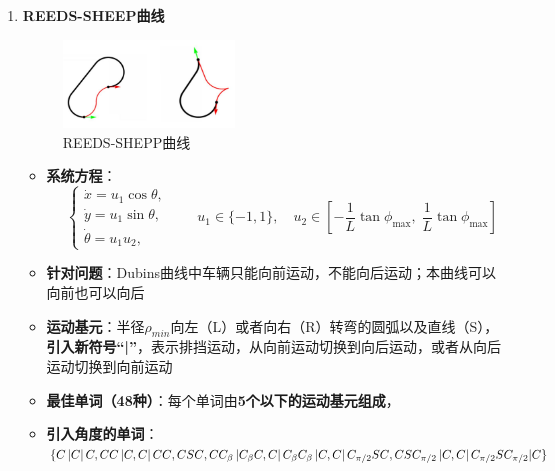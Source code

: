 \documentclass[../main.tex]{subfiles}
\begin{document}
\begin{enumerate}
\begin{itemize}
\begin{enumerate}
                        \item \textbf{REEDS-SHEEP曲线}
                            \begin{figure}[H]
                                \centering
                                \includegraphics[width=0.43\textwidth]{images/reedssheep.png}
                                \caption{REEDS-SHEPP曲线}
                            \end{figure} 
                        \begin{itemize}
                            \item \textbf{系统方程}：\[
                            \quad
                            \begin{cases}
                            \dot{x} = u_1 \cos\theta, \\[4pt]
                            \dot{y} = u_1 \sin\theta, \\[4pt]
                            \dot{\theta} = u_1 u_2,
                            \end{cases}
                            \qquad
                            u_1 \in \{-1, 1\}, \quad
                            u_2 \in \left[-\dfrac{1}{L}\tan\phi_{\max},\; \dfrac{1}{L}\tan\phi_{\max}\right]
                            \]
                            \item \textbf{针对问题}：Dubins曲线中车辆只能向前运动，不能向后运动；本曲线可以向前也可以向后
                            \item \textbf{运动基元}：半径$\rho_{min}$向左（L）或者向右（R）转弯的圆弧以及直线（S），\textbf{引入新符号“|”}，表示排挡运动，从向前运动切换到向后运动，或者从向后运动切换到向前运动
                            \item \textbf{最佳单词（48种）}：每个单词由\textbf{5个以下的运动基元组成}，
                            \item \textbf{引入角度的单词}：\( \{ C\left| C\right| C,{CC}\left| {C,C}\right| {CC},{CSC},C{C}_{\beta }\left| {{C}_{\beta }C,C}\right| {C}_{\beta }{C}_{\beta }\left| {C,C}\right| {C}_{\pi /2}{SC}
                            \\,{CS}{C}_{\pi /2}\left| {C,C}\right| {C}_{\pi /2}S{C}_{\pi /2}|C\} \)

\end{itemize}
\end{enumerate}
\end{itemize}
\end{enumerate}
\end{document}
